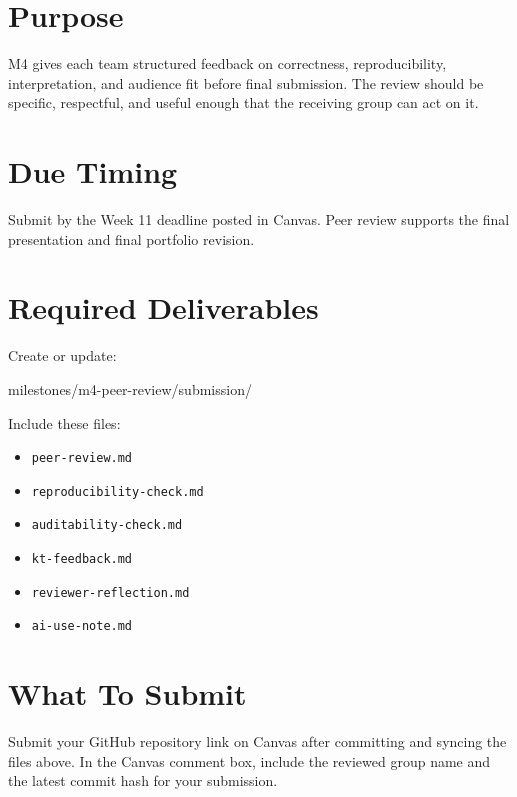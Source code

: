 \documentclass[
  letterpaper,
  DIV=11,
  numbers=noendperiod,
  oneside]{scrreprt}
\newenvironment{Shaded}{\begin{snugshade}}{\end{snugshade}}
\newcommand{\NormalTok}[1]{\textcolor[rgb]{0.00,0.23,0.31}{#1}}
\providecommand{\tightlist}{%
  \setlength{\itemsep}{0pt}\setlength{\parskip}{0pt}}
\begin{document}
\section{Purpose}\label{purpose-5}

M4 gives each team structured feedback on correctness, reproducibility,
interpretation, and audience fit before final submission. The review
should be specific, respectful, and useful enough that the receiving
group can act on it.

\section{Due Timing}\label{due-timing-4}

Submit by the Week 11 deadline posted in Canvas. Peer review supports
the final presentation and final portfolio revision.

\section{Required Deliverables}\label{required-deliverables-4}

Create or update:

\begin{Shaded}
\begin{Highlighting}[numbers=left,,]
\NormalTok{milestones/m4{-}peer{-}review/submission/}
\end{Highlighting}
\end{Shaded}

Include these files:

\begin{itemize}
\tightlist
\item
  \texttt{peer-review.md}
\item
  \texttt{reproducibility-check.md}
\item
  \texttt{auditability-check.md}
\item
  \texttt{kt-feedback.md}
\item
  \texttt{reviewer-reflection.md}
\item
  \texttt{ai-use-note.md}
\end{itemize}

\section{What To Submit}\label{what-to-submit-4}

Submit your GitHub repository link on Canvas after committing and
syncing the files above. In the Canvas comment box, include the reviewed
group name and the latest commit hash for your submission.
\end{document}
